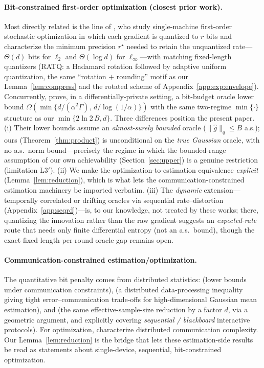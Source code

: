 \documentclass[11pt]{article}
\theoremstyle{definition}
\begin{document}
\paragraph{Bit-constrained first-order optimization (closest prior work).} Most directly related is the
line of \citet{mayekartyagi2020ratq,mayekartyagi2020limits}, who study single-machine first-order
stochastic optimization in which each gradient is quantized to $r$ bits and characterize the minimum
precision $r^\star$ needed to retain the unquantized rate---$\Theta(d)$ bits for $\ell_2$ and
$\Theta(\log d)$ for $\ell_\infty$---with matching fixed-length quantizers (RATQ: a Hadamard rotation
followed by adaptive uniform quantization, the same ``rotation $+$ rounding'' motif as our
Lemma~\ref{lem:compress} and the rotated scheme of Appendix~\ref{app:exp:envelope}). Concurrently,
\citet{menartnikolov2025gradient} prove, in a differentially-private setting, a bit-budget oracle
lower bound $\Omega(\min\{d/(\alpha^2\Gamma),\,d/\log(1/\alpha)\})$ with the same two-regime $\min\{\cdot\}$
structure as our $\min\{2\ln2\,B,d\}$. Three differences position the present paper. (i) Their lower
bounds assume an \emph{almost-surely bounded} oracle ($\|\hat g\|_q\le B$ a.s.); ours
(Theorem~\ref{thm:product}) is unconditional on the \emph{true Gaussian} oracle, with no a.s.\ norm
bound---precisely the regime in which the bounded-range assumption of our own achievability
(Section~\ref{sec:upper}) is a genuine restriction (limitation L3$'$). (ii) We make the
optimization-to-estimation equivalence \emph{explicit} (Lemma~\ref{lem:reduction}), which is what lets
the communication-constrained estimation machinery be imported verbatim. (iii) The \emph{dynamic}
extension---temporally correlated or drifting oracles via sequential rate--distortion
(Appendix~\ref{app:seqrd})---is, to our knowledge, not treated by these works; there, quantizing the
innovation rather than the raw gradient suggests an \emph{expected-rate} route that needs only finite
differential entropy (not an a.s.\ bound), though the exact fixed-length per-round oracle gap remains
open.

\paragraph{Communication-constrained estimation/optimization.} The quantitative bit penalty comes from
distributed statistics: \citet{zhang2013distributed} (lower bounds under communication constraints),
\citet{braverman2016ddpi} (a distributed data-processing inequality giving tight error--communication
trade-offs for high-dimensional Gaussian mean estimation), and \citet{han2018geometric} (the same
effective-sample-size reduction by a factor $d$, via a geometric argument, and explicitly covering
\emph{sequential / blackboard} interactive protocols). For optimization,
\citet{arjevani2015communication} characterize distributed communication complexity. Our
Lemma~\ref{lem:reduction} is the bridge that lets these estimation-side results be read as statements
about single-device, sequential, bit-constrained optimization.
\end{document}
